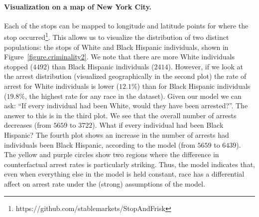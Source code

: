 \paragraph{Visualization on a map of New York City.}
Each of the stops can be mapped to longitude and latitude points for
where the stop
occurred\footnote{https://github.com/stablemarkets/StopAndFrisk}. This allows us to visualize the distribution of two distinct populations: the stops of White and Black Hispanic individuals, shown in Figure~\ref{figure.criminality2}. We note that there are more White individuals stopped ($4492$) than Black Hispanic individuals ($2414$). However, if we look at the arrest distribution (visualized geographically in the second plot) the rate of arrest for White individuals is lower ($12.1\%$) than for Black Hispanic individuals ($19.8\%$, the highest rate for any race in the dataset). Given our model we can ask: ``If every individual had been White, would they have been arrested?''. The answer to this is in the third plot. We see that the overall number of arrests decreases (from $5659$ to $3722$). What if every individual had been Black Hispanic? The fourth plot shows an increase in the number of arrests had individuals been Black Hispanic, according to the model (from $5659$ to $6439$). The yellow and purple circles show two regions where the difference in counterfactual arrest rates is particularly striking. Thus, the model indicates that, even when everything else in the model is held constant, race has a differential affect on arrest rate under the (strong) assumptions of the model.



